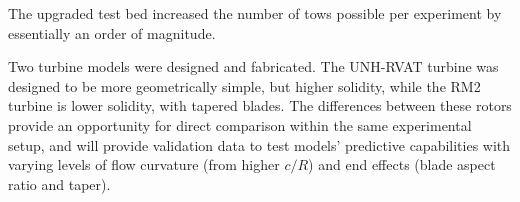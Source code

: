 The upgraded test bed increased the number of tows possible per experiment by
essentially an order of magnitude.

Two turbine models were designed and fabricated. The UNH-RVAT turbine was
designed to be more geometrically simple, but higher solidity, while the RM2
turbine is lower solidity, with tapered blades. The differences between these
rotors provide an opportunity for direct comparison within the same experimental
setup, and will provide validation data to test models' predictive capabilities
with varying levels of flow curvature (from higher $c/R$) and end effects (blade
aspect ratio and taper).
